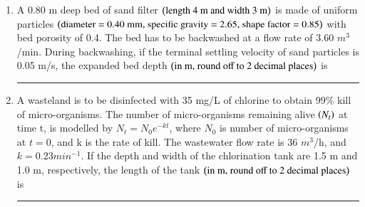 \documentclass[journal]{IEEEtran}
\numberwithin{equation}{enumi}
\numberwithin{figure}{enumi}
\begin{document}
\begin{enumerate}
\item A 0.80 m deep bed of sand filter $\left(\text{length 4 m and width 3 m}\right)$ is made of uniform particles $\left(\text{diameter = 0.40 mm, specific gravity = 2.65, shape factor = 0.85}\right)$ with bed porosity of 0.4. The bed has to be backwashed at a flow rate of 3.60 $m^3$/min. During backwashing, if the terminal settling velocity of sand particles is 0.05 m/s, the expanded bed depth $\left(\text{in m, round off to 2 decimal places}\right)$ is \rule{1cm}{0.4pt}
\item A wasteland is to be disinfected with 35 mg/L of chlorine to obtain 99\% kill of micro-organisms. The number of micro-organisms remaining alive $\left(N_t\right)$ at time t, is modelled by $N_t = N_0e^{-kt}$, where $N_0$ is number of micro-organisms at $t = 0$, and k is the rate of kill. The wastewater flow rate is 36 $m^3$/h, and $k = 0.23 min^{-1}$. If the depth and width of the chlorination tank are 1.5 m and 1.0 m, respectively, the length of the tank $\left(\text{in m, round off to 2 decimal places}\right)$ is \rule{1cm}{0.4pt}
\end{enumerate}
\end{document}
